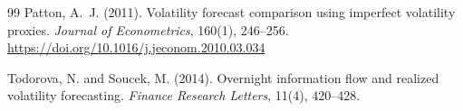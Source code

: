 \documentclass[11pt,a4paper]{article}
\begin{document}
\begin{thebibliography}{99}
Patton, A.~J. (2011).
\newblock Volatility forecast comparison using imperfect volatility proxies.
\newblock \emph{Journal of Econometrics}, 160(1), 246--256.
\newblock \url{https://doi.org/10.1016/j.jeconom.2010.03.034}

Todorova, N. and Soucek, M. (2014).
\newblock Overnight information flow and realized volatility forecasting.
\newblock \emph{Finance Research Letters}, 11(4), 420--428.

\end{thebibliography}
\end{document}
